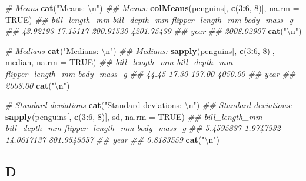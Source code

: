 \documentclass[
]{article}
\newenvironment{Shaded}{\begin{snugshade}}{\end{snugshade}}
\newcommand{\CharTok}[1]{\textcolor[rgb]{0.31,0.60,0.02}{#1}}
\newcommand{\CommentTok}[1]{\textcolor[rgb]{0.56,0.35,0.01}{\textit{#1}}}
\newcommand{\DataTypeTok}[1]{\textcolor[rgb]{0.13,0.29,0.53}{#1}}
\newcommand{\DecValTok}[1]{\textcolor[rgb]{0.00,0.00,0.81}{#1}}
\newcommand{\KeywordTok}[1]{\textcolor[rgb]{0.13,0.29,0.53}{\textbf{#1}}}
\newcommand{\NormalTok}[1]{#1}
\newcommand{\OperatorTok}[1]{\textcolor[rgb]{0.81,0.36,0.00}{\textbf{#1}}}
\newcommand{\OtherTok}[1]{\textcolor[rgb]{0.56,0.35,0.01}{#1}}
\newcommand{\StringTok}[1]{\textcolor[rgb]{0.31,0.60,0.02}{#1}}
\begin{document}
\begin{Shaded}
\begin{Highlighting}[]
\CommentTok{\# Means}
\KeywordTok{cat}\NormalTok{(}\StringTok{"Means: }\CharTok{\textbackslash{}n}\StringTok{"}\NormalTok{)}
\CommentTok{\#\# Means:}
\KeywordTok{colMeans}\NormalTok{(penguins[, }\KeywordTok{c}\NormalTok{(}\DecValTok{3}\OperatorTok{:}\DecValTok{6}\NormalTok{, }\DecValTok{8}\NormalTok{)], }\DataTypeTok{na.rm =} \OtherTok{TRUE}\NormalTok{)}
\CommentTok{\#\#    bill\_length\_mm     bill\_depth\_mm flipper\_length\_mm       body\_mass\_g }
\CommentTok{\#\#          43.92193          17.15117         200.91520        4201.75439 }
\CommentTok{\#\#              year }
\CommentTok{\#\#        2008.02907}
\KeywordTok{cat}\NormalTok{(}\StringTok{"}\CharTok{\textbackslash{}n}\StringTok{"}\NormalTok{)}

\CommentTok{\# Medians}
\KeywordTok{cat}\NormalTok{(}\StringTok{"Medians: }\CharTok{\textbackslash{}n}\StringTok{"}\NormalTok{)}
\CommentTok{\#\# Medians:}
\KeywordTok{sapply}\NormalTok{(penguins[, }\KeywordTok{c}\NormalTok{(}\DecValTok{3}\OperatorTok{:}\DecValTok{6}\NormalTok{, }\DecValTok{8}\NormalTok{)], median, }\DataTypeTok{na.rm =} \OtherTok{TRUE}\NormalTok{)}
\CommentTok{\#\#    bill\_length\_mm     bill\_depth\_mm flipper\_length\_mm       body\_mass\_g }
\CommentTok{\#\#             44.45             17.30            197.00           4050.00 }
\CommentTok{\#\#              year }
\CommentTok{\#\#           2008.00}
\KeywordTok{cat}\NormalTok{(}\StringTok{"}\CharTok{\textbackslash{}n}\StringTok{"}\NormalTok{)}

\CommentTok{\# Standard deviations}
\KeywordTok{cat}\NormalTok{(}\StringTok{"Standard deviations: }\CharTok{\textbackslash{}n}\StringTok{"}\NormalTok{)}
\CommentTok{\#\# Standard deviations:}
\KeywordTok{sapply}\NormalTok{(penguins[, }\KeywordTok{c}\NormalTok{(}\DecValTok{3}\OperatorTok{:}\DecValTok{6}\NormalTok{, }\DecValTok{8}\NormalTok{)], sd, }\DataTypeTok{na.rm =} \OtherTok{TRUE}\NormalTok{)}
\CommentTok{\#\#    bill\_length\_mm     bill\_depth\_mm flipper\_length\_mm       body\_mass\_g }
\CommentTok{\#\#         5.4595837         1.9747932        14.0617137       801.9545357 }
\CommentTok{\#\#              year }
\CommentTok{\#\#         0.8183559}
\KeywordTok{cat}\NormalTok{(}\StringTok{"}\CharTok{\textbackslash{}n}\StringTok{"}\NormalTok{)}
\end{Highlighting}
\end{Shaded}

\hypertarget{d}{%
\subsection{D}\label{d}}
\end{document}
